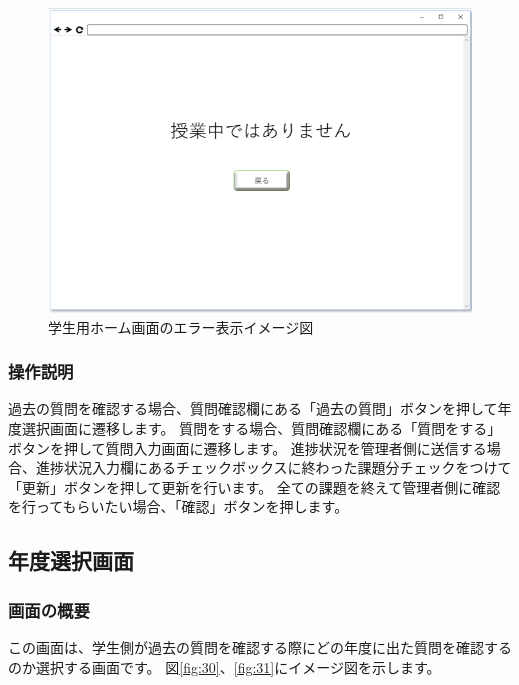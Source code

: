 \begin{figure}[htbp]
\begin{center}
  \includegraphics[width=1\linewidth,clip]{./img/00.png}
  \caption{学生用ホーム画面のエラー表示イメージ図}\label{fig:00}
\end{center}
\end{figure}

\subsubsection{操作説明}
過去の質問を確認する場合、質問確認欄にある「過去の質問」ボタンを押して年度選択画面に遷移します。
質問をする場合、質問確認欄にある「質問をする」ボタンを押して質問入力画面に遷移します。
進捗状況を管理者側に送信する場合、進捗状況入力欄にあるチェックボックスに終わった課題分チェックをつけて「更新」ボタンを押して更新を行います。
全ての課題を終えて管理者側に確認を行ってもらいたい場合、「確認」ボタンを押します。

\newpage

\subsection{年度選択画面}
\subsubsection{画面の概要}
この画面は、学生側が過去の質問を確認する際にどの年度に出た質問を確認するのか選択する画面です。
図\ref{fig:30}、\ref{fig:31}にイメージ図を示します。


